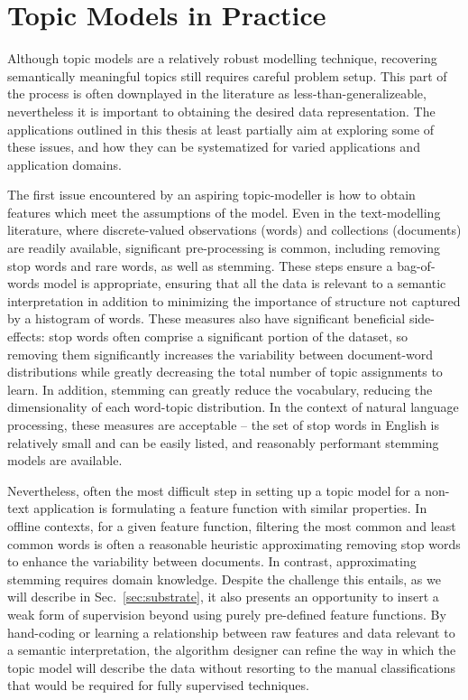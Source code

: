 \section{Topic Models in Practice} \label{sec:topic-models-inpractice}
Although topic models are a relatively robust modelling technique, recovering semantically meaningful topics still requires careful problem setup. This part of the process is often downplayed in the literature as less-than-generalizeable, nevertheless it is important to obtaining the desired data representation. The applications outlined in this thesis at least partially aim at exploring some of these issues, and how they can be systematized for varied applications and application domains.

The first issue encountered by an aspiring topic-modeller is how to obtain features which meet the assumptions of the model. Even in the text-modelling literature, where discrete-valued observations (words) and collections (documents) are readily available, significant pre-processing is common, including removing stop words and rare words, as well as stemming. These steps ensure a bag-of-words model is appropriate, ensuring that all the data is relevant to a semantic interpretation in addition to minimizing the importance of structure not captured by a histogram of words. These measures also have significant beneficial side-effects: stop words often comprise a significant portion of the dataset, so removing them significantly increases the variability between document-word distributions while greatly decreasing the total number of topic assignments to learn. In addition, stemming can greatly reduce the vocabulary, reducing the dimensionality of each word-topic distribution. In the context of natural language processing, these measures are acceptable -- the set of stop words in English is relatively small and can be easily listed, and reasonably performant stemming models are available.

Nevertheless, often the most difficult step in setting up a topic model for a non-text application is formulating a feature function with similar properties. In offline contexts, for a given feature function, filtering the most common and least common words is often a reasonable heuristic approximating removing stop words to enhance the variability between documents. In contrast, approximating stemming requires domain knowledge. Despite the challenge this entails, as we will describe in Sec.~\ref{sec:substrate}, it also presents an opportunity to insert a weak form of supervision beyond using purely pre-defined feature functions. By hand-coding or learning a relationship between raw features and data relevant to a semantic interpretation, the algorithm designer can refine the way in which the topic model will describe the data without resorting to the manual classifications that would be required for fully supervised techniques.


